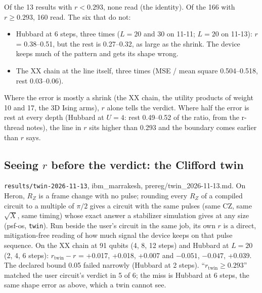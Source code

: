 \documentclass[10pt,a4paper]{article}
\begin{document}
Of the 13 results with $r < 0.293$, none read (the identity). Of the 166 with $r \ge 0.293$, 160 read. The six that do
not:
\begin{itemize}
\item Hubbard at 6 steps, three times ($L = 20$ and 30 on 11-11; $L = 20$ on 11-13): $r$ = 0.38--0.51, but the rest is
0.27--0.32, as large as the shrink. The device keeps much of the pattern and gets its shape wrong.
\item The XX chain at the line itself, three times (MSE / mean square 0.504--0.518, rest 0.03--0.06).
\end{itemize}
Where the error is mostly a shrink (the XX chain, the utility products of weight 10 and 17, the 3D Ising arms), $r$ alone
tells the verdict. Where half the error is rest at every depth (Hubbard at $U = 4$: rest 0.49--0.52 of the ratio, from
the r-thread notes), the line in $r$ sits higher than 0.293 and the boundary comes earlier than $r$ says.

\subsection{Seeing $r$ before the verdict: the Clifford twin}
\texttt{results/twin-2026-11-13}, ibm\_marrakesh, prereg/twin\_2026-11-13.md. On Heron, $R_Z$ is a frame change with no
pulse; rounding every $R_Z$ of a compiled circuit to a multiple of $\pi/2$ gives a circuit with the same pulses (same
CZ, same $\sqrt X$, same timing) whose exact answer a stabilizer simulation gives at any size (psf-os, \texttt{twin}).
Run beside the user's circuit in the same job, its own $r$ is a direct, mitigation-free reading of how much signal the
device keeps on that pulse sequence. On the XX chain at 91 qubits (4, 8, 12 steps) and Hubbard at $L = 20$ (2, 4, 6
steps): $r_{\text{twin}} - r$ = +0.017, +0.018, +0.007 and $-0.051$, $-0.047$, +0.039. The declared bound 0.05 failed
narrowly (Hubbard at 2 steps). ``$r_{\text{twin}} \ge 0.293$'' matched the user circuit's verdict in 5 of 6; the miss is
Hubbard at 6 steps, the same shape error as above, which a twin cannot see.
\end{document}
